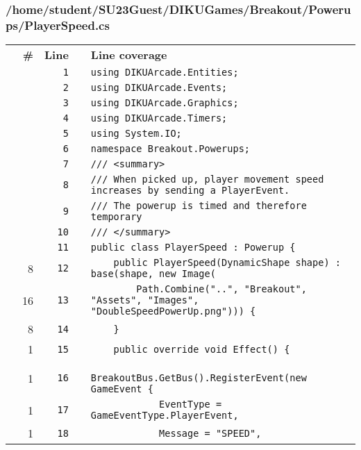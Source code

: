 \documentclass[a4paper,landscape,10pt]{article}
\begin{document}
\subsubsection{/home/student/SU23Guest/DIKUGames/Breakout/Powerups/PlayerSpeed.cs}
\begin{longtable}[l]{lrrll}
\textbf{} & \textbf{\#} & \textbf{Line} & \textbf{} & \textbf{Line coverage}\\
\cellcolor{gray} &  & \verb~1~ & & \verb~using DIKUArcade.Entities;~\\
\cellcolor{gray} &  & \verb~2~ & & \verb~using DIKUArcade.Events;~\\
\cellcolor{gray} &  & \verb~3~ & & \verb~using DIKUArcade.Graphics;~\\
\cellcolor{gray} &  & \verb~4~ & & \verb~using DIKUArcade.Timers;~\\
\cellcolor{gray} &  & \verb~5~ & & \verb~using System.IO;~\\
\cellcolor{gray} &  & \verb~6~ & & \verb~namespace Breakout.Powerups;~\\
\cellcolor{gray} &  & \verb~7~ & & \verb~/// <summary>~\\
\cellcolor{gray} &  & \verb~8~ & & \verb~/// When picked up, player movement speed increases by sending a PlayerEvent.~\\
\cellcolor{gray} &  & \verb~9~ & & \verb~/// The powerup is timed and therefore temporary~\\
\cellcolor{gray} &  & \verb~10~ & & \verb~/// </summary>~\\
\cellcolor{gray} &  & \verb~11~ & & \verb~public class PlayerSpeed : Powerup {~\\
\cellcolor{green} & 8 & \verb~12~ & & \verb~    public PlayerSpeed(DynamicShape shape) : base(shape, new Image(~\\
\cellcolor{green} & 16 & \verb~13~ & & \verb~        Path.Combine("..", "Breakout", "Assets", "Images", "DoubleSpeedPowerUp.png"))) {~\\
\cellcolor{green} & 8 & \verb~14~ & & \verb~    }~\\
\cellcolor{green} & 1 & \verb~15~ & & \verb~    public override void Effect() {~\\
\cellcolor{green} & 1 & \verb~16~ & & \verb~        BreakoutBus.GetBus().RegisterEvent(new GameEvent {~\\
\cellcolor{green} & 1 & \verb~17~ & & \verb~            EventType = GameEventType.PlayerEvent,~\\
\cellcolor{green} & 1 & \verb~18~ & & \verb~            Message = "SPEED",~\\

\end{longtable}
\end{document}
